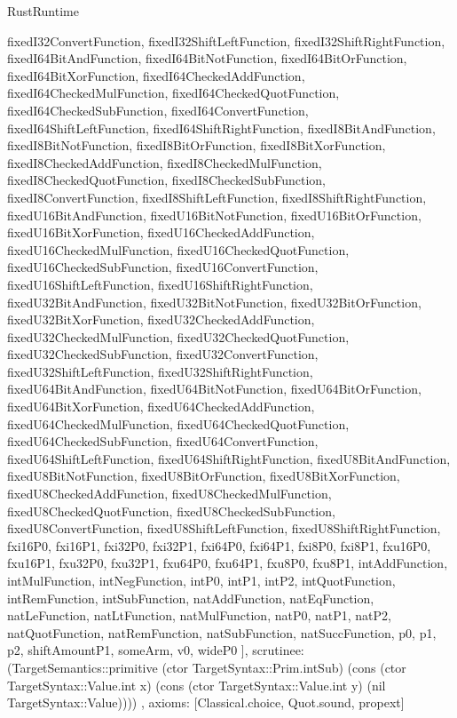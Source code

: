 \begin{lexlean}{RustRuntime}
\begin{semanticmodule}
{{      fixedI32ConvertFunction,
      fixedI32ShiftLeftFunction,
      fixedI32ShiftRightFunction,
      fixedI64BitAndFunction,
      fixedI64BitNotFunction,
      fixedI64BitOrFunction,
      fixedI64BitXorFunction,
      fixedI64CheckedAddFunction,
      fixedI64CheckedMulFunction,
      fixedI64CheckedQuotFunction,
      fixedI64CheckedSubFunction,
      fixedI64ConvertFunction,
      fixedI64ShiftLeftFunction,
      fixedI64ShiftRightFunction,
      fixedI8BitAndFunction,
      fixedI8BitNotFunction,
      fixedI8BitOrFunction,
      fixedI8BitXorFunction,
      fixedI8CheckedAddFunction,
      fixedI8CheckedMulFunction,
      fixedI8CheckedQuotFunction,
      fixedI8CheckedSubFunction,
      fixedI8ConvertFunction,
      fixedI8ShiftLeftFunction,
      fixedI8ShiftRightFunction,
      fixedU16BitAndFunction,
      fixedU16BitNotFunction,
      fixedU16BitOrFunction,
      fixedU16BitXorFunction,
      fixedU16CheckedAddFunction,
      fixedU16CheckedMulFunction,
      fixedU16CheckedQuotFunction,
      fixedU16CheckedSubFunction,
      fixedU16ConvertFunction,
      fixedU16ShiftLeftFunction,
      fixedU16ShiftRightFunction,
      fixedU32BitAndFunction,
      fixedU32BitNotFunction,
      fixedU32BitOrFunction,
      fixedU32BitXorFunction,
      fixedU32CheckedAddFunction,
      fixedU32CheckedMulFunction,
      fixedU32CheckedQuotFunction,
      fixedU32CheckedSubFunction,
      fixedU32ConvertFunction,
      fixedU32ShiftLeftFunction,
      fixedU32ShiftRightFunction,
      fixedU64BitAndFunction,
      fixedU64BitNotFunction,
      fixedU64BitOrFunction,
      fixedU64BitXorFunction,
      fixedU64CheckedAddFunction,
      fixedU64CheckedMulFunction,
      fixedU64CheckedQuotFunction,
      fixedU64CheckedSubFunction,
      fixedU64ConvertFunction,
      fixedU64ShiftLeftFunction,
      fixedU64ShiftRightFunction,
      fixedU8BitAndFunction,
      fixedU8BitNotFunction,
      fixedU8BitOrFunction,
      fixedU8BitXorFunction,
      fixedU8CheckedAddFunction,
      fixedU8CheckedMulFunction,
      fixedU8CheckedQuotFunction,
      fixedU8CheckedSubFunction,
      fixedU8ConvertFunction,
      fixedU8ShiftLeftFunction,
      fixedU8ShiftRightFunction,
      fxi16P0,
      fxi16P1,
      fxi32P0,
      fxi32P1,
      fxi64P0,
      fxi64P1,
      fxi8P0,
      fxi8P1,
      fxu16P0,
      fxu16P1,
      fxu32P0,
      fxu32P1,
      fxu64P0,
      fxu64P1,
      fxu8P0,
      fxu8P1,
      intAddFunction,
      intMulFunction,
      intNegFunction,
      intP0,
      intP1,
      intP2,
      intQuotFunction,
      intRemFunction,
      intSubFunction,
      natAddFunction,
      natEqFunction,
      natLeFunction,
      natLtFunction,
      natMulFunction,
      natP0,
      natP1,
      natP2,
      natQuotFunction,
      natRemFunction,
      natSubFunction,
      natSuccFunction,
      p0,
      p1,
      p2,
      shiftAmountP1,
      someArm,
      v0,
      wideP0
    ],
    scrutinee: (TargetSemantics::primitive (ctor TargetSyntax::Prim.intSub) (cons (ctor TargetSyntax::Value.int x) (cons (ctor TargetSyntax::Value.int y) (nil TargetSyntax::Value))))
  },
  axioms: [Classical.choice, Quot.sound, propext]
}


\end{semanticmodule}
\end{lexlean}
